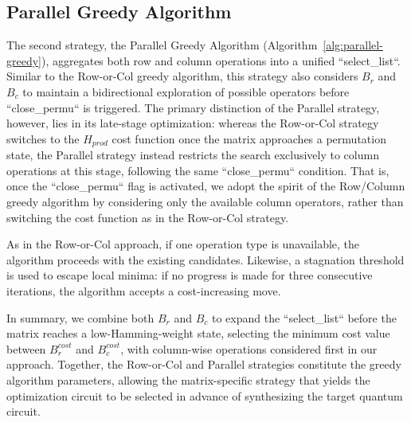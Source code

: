 \subsection{Parallel Greedy Algorithm}
The second strategy, the Parallel Greedy Algorithm
(Algorithm~\ref{alg:parallel-greedy}), aggregates both row and column
operations into a unified ``select\_list``. Similar to the Row-or-Col
greedy algorithm, this strategy also considers $B_{r}$ and $B_{c}$ to
maintain a bidirectional exploration of possible operators before
``close\_permu`` is triggered. The primary distinction of the
Parallel strategy, however, lies in its late-stage optimization: whereas
the Row-or-Col strategy switches to the $H_{prod}$ cost function once the
matrix approaches a permutation state, the Parallel strategy instead
restricts the search exclusively to column operations at this stage,
following the same ``close\_permu`` condition. That is, once the
``close\_permu`` flag is activated, we adopt the spirit of the
Row/Column greedy algorithm by considering only the available column
operators, rather than switching the cost function as in the Row-or-Col
strategy.

As in the Row-or-Col approach, if one operation type is unavailable, the
algorithm proceeds with the existing candidates. Likewise, a stagnation
threshold is used to escape local minima: if no progress is made for
three consecutive iterations, the algorithm accepts a cost-increasing
move.

In summary, we combine both $B_{r}$ and $B_{c}$ to expand the
``select\_list`` before the matrix reaches a low-Hamming-weight
state, selecting the minimum cost value between $B_{r}^{cost}$ and
$B_{c}^{cost}$, with column-wise operations considered first in our
approach. Together, the Row-or-Col and Parallel strategies constitute the
greedy algorithm parameters, allowing the matrix-specific strategy that
yields the optimization circuit to be selected in advance of synthesizing the
target quantum circuit.



